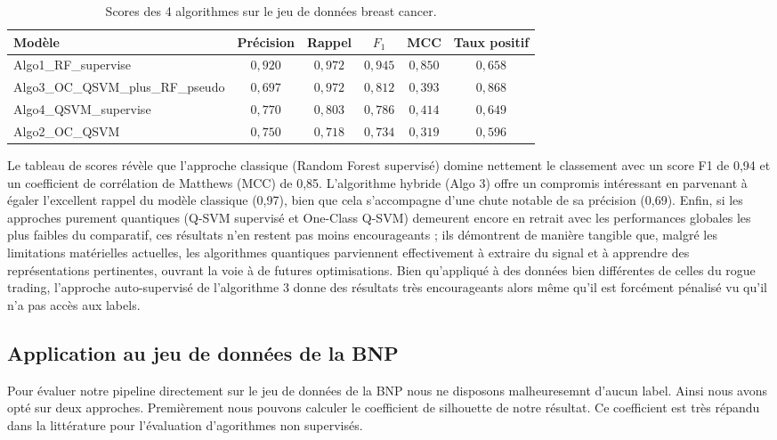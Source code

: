 \documentclass[a4paper]{article}
\begin{document}
\begin{table}[H]
    \centering
    \begin{tabular}{lccccc}
        \hline
        Modèle & Précision & Rappel & $F_1$ & MCC & Taux positif \\
        \hline
        Algo1\_RF\_supervise              & $0{,}920$ & $0{,}972$ & $0{,}945$ & $0{,}850$ & $0{,}658$ \\
        Algo3\_OC\_QSVM\_plus\_RF\_pseudo & $0{,}697$ & $0{,}972$ & $0{,}812$ & $0{,}393$ & $0{,}868$ \\
        Algo4\_QSVM\_supervise            & $0{,}770$ & $0{,}803$ & $0{,}786$ & $0{,}414$ & $0{,}649$ \\
        Algo2\_OC\_QSVM                   & $0{,}750$ & $0{,}718$ & $0{,}734$ & $0{,}319$ & $0{,}596$ \\
        \hline
    \end{tabular}
    \caption{Scores des 4 algorithmes sur le jeu de données breast cancer.}
    \label{tab:scores-breast-cancer}
\end{table}

Le tableau de scores révèle que l'approche classique (Random Forest supervisé) domine nettement le classement avec un score F1 de 0,94 et un coefficient de corrélation de Matthews (MCC) de 0,85. L'algorithme hybride (Algo 3) offre un compromis intéressant en parvenant à égaler l'excellent rappel du modèle classique (0,97), bien que cela s'accompagne d'une chute notable de sa précision (0,69). Enfin, si les approches purement quantiques (Q-SVM supervisé et One-Class Q-SVM) demeurent encore en retrait avec les performances globales les plus faibles du comparatif, ces résultats n'en restent pas moins encourageants ; ils démontrent de manière tangible que, malgré les limitations matérielles actuelles, les algorithmes quantiques parviennent effectivement à extraire du signal et à apprendre des représentations pertinentes, ouvrant la voie à de futures optimisations. Bien qu'appliqué à des données bien différentes de celles du rogue trading, l'approche auto-supervisé de l'algorithme 3 donne des résultats très encourageants alors même qu'il est forcément pénalisé vu qu'il n'a pas accès aux labels.  

\subsection{Application au jeu de données de la BNP}

Pour évaluer notre pipeline directement sur le jeu de données de la BNP nous ne disposons malheuresemnt d'aucun label. Ainsi nous avons opté sur deux approches. Premièrement nous pouvons calculer le coefficient de silhouette de notre résultat. Ce coefficient est très répandu dans la littérature pour l'évaluation d'agorithmes non supervisés. 
\end{document}
